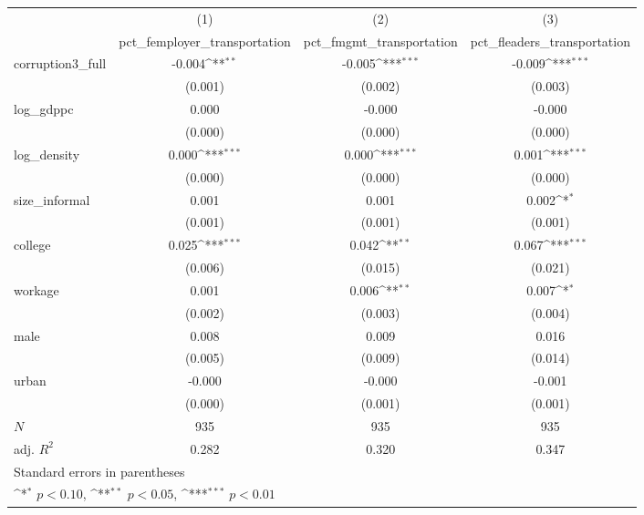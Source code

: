 {
\def\sym#1{\ifmmode^{#1}\else\(^{#1}\)\fi}
\begin{tabular}{l*{3}{c}}
\hline\hline
            &\multicolumn{1}{c}{(1)}&\multicolumn{1}{c}{(2)}&\multicolumn{1}{c}{(3)}\\
            &\multicolumn{1}{c}{pct\_femployer\_transportation}&\multicolumn{1}{c}{pct\_fmgmt\_transportation}&\multicolumn{1}{c}{pct\_fleaders\_transportation}\\
\hline
corruption3\_full&      -0.004\sym{**} &      -0.005\sym{***}&      -0.009\sym{***}\\
            &     (0.001)         &     (0.002)         &     (0.003)         \\
[1em]
log\_gdppc   &       0.000         &      -0.000         &      -0.000         \\
            &     (0.000)         &     (0.000)         &     (0.000)         \\
[1em]
log\_density &       0.000\sym{***}&       0.000\sym{***}&       0.001\sym{***}\\
            &     (0.000)         &     (0.000)         &     (0.000)         \\
[1em]
size\_informal&       0.001         &       0.001         &       0.002\sym{*}  \\
            &     (0.001)         &     (0.001)         &     (0.001)         \\
[1em]
college     &       0.025\sym{***}&       0.042\sym{**} &       0.067\sym{***}\\
            &     (0.006)         &     (0.015)         &     (0.021)         \\
[1em]
workage     &       0.001         &       0.006\sym{**} &       0.007\sym{*}  \\
            &     (0.002)         &     (0.003)         &     (0.004)         \\
[1em]
male        &       0.008         &       0.009         &       0.016         \\
            &     (0.005)         &     (0.009)         &     (0.014)         \\
[1em]
urban       &      -0.000         &      -0.000         &      -0.001         \\
            &     (0.000)         &     (0.001)         &     (0.001)         \\
\hline
\(N\)       &         935         &         935         &         935         \\
adj. \(R^{2}\)&       0.282         &       0.320         &       0.347         \\
\hline\hline
\multicolumn{4}{l}{\footnotesize Standard errors in parentheses}\\
\multicolumn{4}{l}{\footnotesize \sym{*} \(p<0.10\), \sym{**} \(p<0.05\), \sym{***} \(p<0.01\)}\\
\end{tabular}
}
